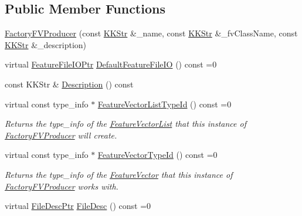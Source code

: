 \subsection*{Public Member Functions}
\begin{DoxyCompactItemize}
\item 
\hyperlink{class_k_k_m_l_l_1_1_factory_f_v_producer_a6840464e9954d43ebbcb75b02abf5531}{Factory\+F\+V\+Producer} (const \hyperlink{class_k_k_b_1_1_k_k_str}{K\+K\+Str} \&\+\_\+name, const \hyperlink{class_k_k_b_1_1_k_k_str}{K\+K\+Str} \&\+\_\+fv\+Class\+Name, const \hyperlink{class_k_k_b_1_1_k_k_str}{K\+K\+Str} \&\+\_\+description)
\item 
virtual \hyperlink{namespace_k_k_m_l_l_aa005d92db87866fad489feb5ff4b2dfa}{Feature\+File\+I\+O\+Ptr} \hyperlink{class_k_k_m_l_l_1_1_factory_f_v_producer_a22605809beffdb9e6b1df75106140458}{Default\+Feature\+File\+IO} () const  =0
\item 
const K\+K\+Str \& \hyperlink{class_k_k_m_l_l_1_1_factory_f_v_producer_a80d44a99f38097839c2be1b0c5db4c6a}{Description} () const 
\item 
virtual const type\+\_\+info $\ast$ \hyperlink{class_k_k_m_l_l_1_1_factory_f_v_producer_a066a7019c56163b37b15ace4ba7cb39a}{Feature\+Vector\+List\+Type\+Id} () const  =0
\begin{DoxyCompactList}\small\item\em Returns the \textquotesingle{}type\+\_\+info\textquotesingle{} of the \hyperlink{class_k_k_m_l_l_1_1_feature_vector_list}{Feature\+Vector\+List} that this instance of \textquotesingle{}\hyperlink{class_k_k_m_l_l_1_1_factory_f_v_producer}{Factory\+F\+V\+Producer}\textquotesingle{} will create. \end{DoxyCompactList}\item 
virtual const type\+\_\+info $\ast$ \hyperlink{class_k_k_m_l_l_1_1_factory_f_v_producer_a412bef4afc38267281bb22fc3d3d7ce8}{Feature\+Vector\+Type\+Id} () const  =0
\begin{DoxyCompactList}\small\item\em Returns the \textquotesingle{}type\+\_\+info\textquotesingle{} of the \hyperlink{class_k_k_m_l_l_1_1_feature_vector}{Feature\+Vector} that this instance of \textquotesingle{}\hyperlink{class_k_k_m_l_l_1_1_factory_f_v_producer}{Factory\+F\+V\+Producer}\textquotesingle{} works with. \end{DoxyCompactList}\item 
virtual \hyperlink{namespace_k_k_m_l_l_aa0d0b6ab4ec18868a399b8455b05d914}{File\+Desc\+Ptr} \hyperlink{class_k_k_m_l_l_1_1_factory_f_v_producer_ab2dea2e51cf9d6a109b52300619e185c}{File\+Desc} () const  =0

\end{DoxyCompactItemize}
